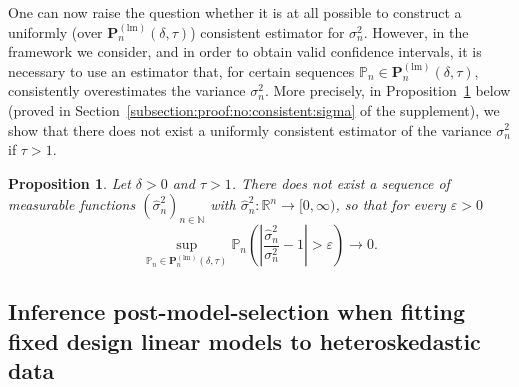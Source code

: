 \documentclass[preprint]{imsart}
\renewcommand{\P}{{\mathbb P}}
\newtheorem{proposition}[theorem]{Proposition}
\numberwithin{equation}{section}
\begin{document}
One can now raise the question whether it is at all possible to construct a uniformly (over $\mathbf{P}_n^{(\mathrm{lm})}(\delta,\tau)$) consistent estimator for $\sigma_n^2$. However, in the framework we consider, and in order to obtain valid confidence intervals, it is necessary to use an estimator that, for certain sequences $\P_n\in \mathbf{P}_n^{(\mathrm{lm})}(\delta,\tau)$, consistently overestimates the variance $\sigma_n^2$. More precisely, in Proposition~\ref{prop:no:consistent:sigma} below (proved in Section~\ref{subsection:proof:no:consistent:sigma} of the supplement), we show that there does not exist a uniformly consistent estimator of the variance $\sigma_n^2$ if $\tau>1$.

\begin{proposition} \label{prop:no:consistent:sigma}
Let $\delta > 0$ and $\tau > 1$. There does \emph{not} exist a sequence of measurable functions $(\hat{\sigma}^2_{n})_{n \in \mathbb{N}}$ with $\hat{\sigma}^2_{n}: \mathbb{R}^n \to [0, \infty)$, so that for every $\varepsilon > 0$
%
\begin{equation}\label{eqn:conscounter}
\sup_{\mathbb{P}_n \in \mathbf{P}_n^{(\mathrm{lm})}(\delta, \tau)} \mathbb{P}_n \left( \left| \frac{\hat{\sigma}^2_n}{\sigma^2_n} - 1 \right| > \varepsilon \right) \to 0.
\end{equation}
%
\end{proposition}



\subsection{Inference post-model-selection when fitting fixed design linear models to heteroskedastic data}
\label{sec:hetlinmods}
\end{document}
